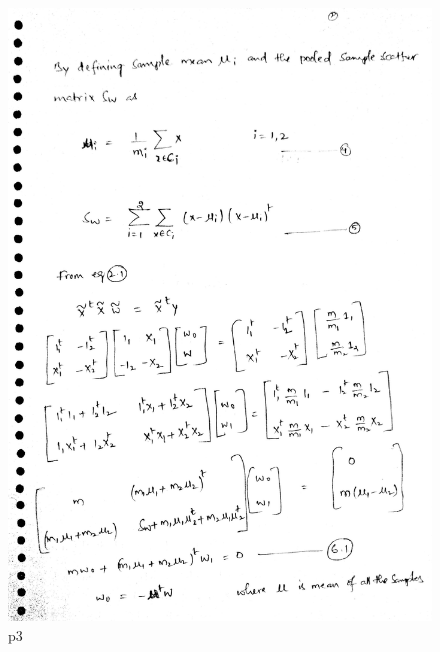 \documentclass[10pt,a4paper]{article}
\begin{document}
\begin{figure}[!h]
\includegraphics[scale=0.03]{images/p4A2_3.jpg}	
  \caption{p3}
  \label{fig:C34T2}
\end{figure}
\graphicspath{ {/images/} }
\end{document}
